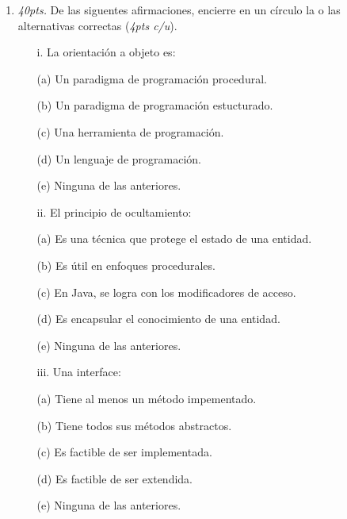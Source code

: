 \documentclass[10pt]{article}
\begin{document}
\begin{enumerate}

    \item \emph{40pts.} De las siguentes afirmaciones, encierre en un c\'irculo la o las alternativas correctas (\emph{4pts c/u}).    

	{\footnotesize
    
    \begin{multicols}{2}

	\begin{enumerate}[label=(\alph*)]
        \item[i.] La orientaci\'on a objeto es: 
        \item[(a)] Un paradigma de programaci\'on procedural.
        \item[(b)] Un paradigma de programaci\'on estucturado.
        \item[(c)] Una herramienta de programaci\'on.
        \item[(d)] Un lenguaje de programaci\'on.
        \item[(e)] Ninguna de las anteriores.
    \end{enumerate}

    \begin{enumerate}[label=(\alph*)]
        \item[ii.] El principio de ocultamiento: 
        \item[(a)] Es una t\'ecnica que protege el estado de una entidad.
        \item[(b)] Es \'util en enfoques procedurales.
        \item[(c)] En Java, se logra con los modificadores de acceso.
        \item[(d)] Es encapsular el conocimiento de una entidad.
        \item[(e)] Ninguna de las anteriores.
    \end{enumerate}

    \begin{enumerate}[label=(\alph*)]
        \item[iii.] Una interface:
        \item[(a)] Tiene al menos un m\'etodo impementado.
        \item[(b)] Tiene todos sus m\'etodos abstractos.
        \item[(c)] Es factible de ser implementada.
        \item[(d)] Es factible de ser extendida.
        \item[(e)] Ninguna de las anteriores.
    \end{enumerate}


\end{multicols}}
\end{enumerate}
\end{document}
